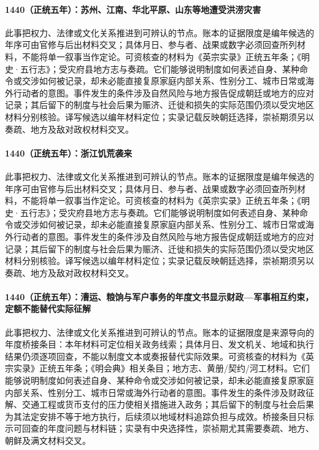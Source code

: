 \paragraph{1440（正统五年）：苏州、江南、华北平原、山东等地遭受洪涝灾害} 此事把权力、法律或文化关系推进到可辨认的节点。账本的证据限度是编年候选的年序可由官修与后出材料交叉；具体月日、参与者、战果或数字必须回查所列材料，不能将单一叙事当作定论。可资核查的材料为《英宗实录》正统五年条；《明史·五行志》；受灾府县地方志与奏疏。它们能够说明制度如何表述自身、某种命令或交涉如何被记录，却未必能直接复原家庭内部关系、性别分工、城市日常或海外行动者的意图。事件发生的条件涉及自然风险与地方报告促成朝廷或地方的应对记录；其后留下的制度与社会后果为赈济、迁徙和损失的实际范围仍须以受灾地区材料分别核验。译写候选以编年材料定位；实录记载反映朝廷选择，崇祯期须另以奏疏、地方及敌对政权材料交叉。

\paragraph{1440（正统五年）：浙江饥荒袭来} 此事把权力、法律或文化关系推进到可辨认的节点。账本的证据限度是编年候选的年序可由官修与后出材料交叉；具体月日、参与者、战果或数字必须回查所列材料，不能将单一叙事当作定论。可资核查的材料为《英宗实录》正统五年条；《明史·五行志》；受灾府县地方志与奏疏。它们能够说明制度如何表述自身、某种命令或交涉如何被记录，却未必能直接复原家庭内部关系、性别分工、城市日常或海外行动者的意图。事件发生的条件涉及自然风险与地方报告促成朝廷或地方的应对记录；其后留下的制度与社会后果为赈济、迁徙和损失的实际范围仍须以受灾地区材料分别核验。译写候选以编年材料定位；实录记载反映朝廷选择，崇祯期须另以奏疏、地方及敌对政权材料交叉。

\paragraph{1440（正统五年）：漕运、粮饷与军户事务的年度文书显示财政—军事相互约束，定额不能替代实际征解} 此事把权力、法律或文化关系推进到可辨认的节点。账本的证据限度是来源导向的年度桥接条目：本年材料可定位相关政务线索；具体月日、发文机关、地域和执行结果仍须逐项回查，不能以制度文本或奏报替代实际效果。可资核查的材料为《英宗实录》正统五年条；《明会典》相关条目；地方志、黄册/契约/河工材料。它们能够说明制度如何表述自身、某种命令或交涉如何被记录，却未必能直接复原家庭内部关系、性别分工、城市日常或海外行动者的意图。事件发生的条件涉及财政征解、交通工程或货币支付的压力使相关措施进入政务；其后留下的制度与社会后果为其法定安排不等于地方执行，后续须以地域材料追踪负担与成效。桥接条目只标示可回查的年度问题与材料链；实录有中央选择性，崇祯期尤其需要奏疏、地方、朝鲜及满文材料交叉。

